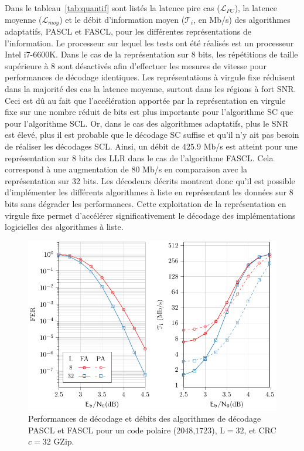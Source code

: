 Dans le tableau~\ref{tab:quantif} sont listés la latence \og pire cas \fg ($\mathcal{L}_{PC}$), la latence moyenne ($\mathcal{L}_{moy}$) et le débit d'information moyen ($\mathcal{T}_i$, en Mb/s) des algorithmes adaptatifs, PASCL et FASCL, pour les différentes représentations de l'information. Le processeur sur lequel les tests ont été réalisés est un processeur Intel i7-6600K. Dans le cas de la représentation sur 8 bits, les \noeuds répétitions de taille supérieure à 8 sont désactivés afin d'effectuer les mesures de vitesse pour performances de décodage identiques. Les représentations à virgule fixe réduisent dans la majorité des cas la latence moyenne, surtout dans les régions à fort SNR. Ceci est dû au fait que l'accélération apportée par la représentation en virgule fixe sur une nombre réduit de bits est plus importante pour l'algorithme SC que pour l'algorithme SCL. Or, dans le cas des algorithmes adaptatifs, plus le SNR est élevé, plus il est probable que le décodage SC suffise et qu'il n'y ait pas besoin de réaliser les décodages SCL. Ainsi, un débit de 425.9 Mb/s est atteint pour une représentation sur 8 bits des LLR dans le cas de l'algorithme FASCL. Cela correspond à une augmentation de 80 Mb/s en comparaison avec la représentation sur 32 bits. Les décodeurs décrits montrent donc qu'il est possible d'implémenter les différents algorithmes à liste en représentant les données sur 8 bits sans dégrader les performances. Cette exploitation de la représentation en virgule fixe permet d'accélérer significativement le décodage des  implémentations logicielles des algorithmes à liste.

\begin{figure}[t]
\includegraphics{main/ch2_fig/curves/ascl/tikz/ascl}
\caption{Performances de décodage et débits des algorithmes de décodage PASCL et FASCL pour un code polaire ($2048$,$1723$), $\mathrm{L}=32$, et CRC $c=32$ GZip.}
\label{fig:ascl_perfs}
\end{figure}


